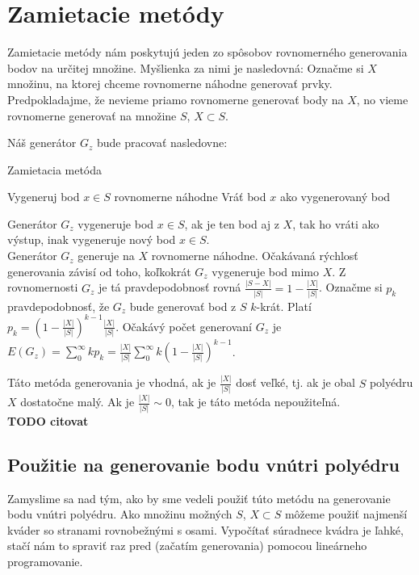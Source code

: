 \chapter{Zamietacie metódy}

Zamietacie metódy nám poskytujú jeden zo spôsobov rovnomerného generovania bodov na určitej množine.
Myšlienka za nimi je nasledovná: Označme si $X$ množinu, na ktorej chceme rovnomerne náhodne generovať prvky. Predpokladajme, že nevieme priamo rovnomerne generovať body na $X$, no vieme rovnomerne generovať na množine $S$, $X \subset S$.

Náš generátor $G_z$ bude pracovať nasledovne:

\begin{algorithm}[H]
	\caption{Zamietacia metóda}
	\label{zamietanie:basic}
	\begin{algorithmic}[1]
		\Repeat Vygeneruj bod $x \in S$ rovnomerne náhodne
		\State Vráť bod $x$ ako vygenerovaný bod
	\end{algorithmic}
\end{algorithm}
Generátor $G_z$ vygeneruje bod $x \in S$, ak je ten bod aj z $X$, tak ho vráti ako výstup, inak vygeneruje nový bod $x \in S$.\\

Generátor $G_z$ generuje na $X$ rovnomerne náhodne. Očakávaná rýchlosť generovania závisí od toho, koľkokrát $G_z$ vygeneruje bod mimo $X$. Z rovnomernosti $G_z$ je tá pravdepodobnosť rovná $\frac{|S-X|}{|S|} = 1-\frac{|X|}{|S|}$. Označme si $p_k$ pravdepodobnosť, že $G_z$ bude generovať bod z $S$ $k$-krát. Platí $p_k= (1-\frac{|X|}{|S|})^{k-1}\frac{|X|}{|S|}$. Očakávý počet generovaní $G_z$ je $E(G_z)=\sum^{\infty}_{0}kp_k=\frac{|X|}{|S|} \sum^{\infty}_{0}k(1-\frac{|X|}{|S|})^{k-1}$.

Táto metóda generovania je vhodná, ak je $\frac{|X|}{|S|}$ dosť veľké, tj. ak je obal $S$ polyédru $X$ dostatočne malý. Ak je $\frac{|X|}{|S|} \sim 0$, tak je táto metóda nepoužiteľná.\\

\textbf{TODO citovat}

\section{Použitie na generovanie bodu vnútri polyédru}

Zamyslime sa nad tým, ako by sme vedeli použiť túto metódu na generovanie bodu vnútri polyédru. Ako množinu možných $S$, $X \subset S$ môžeme použiť najmenší kváder so stranami rovnobežnými s osami. Vypočítať súradnece kvádra je ľahké, stačí nám to spraviť raz pred (začatím generovania) pomocou lineárneho programovanie.

